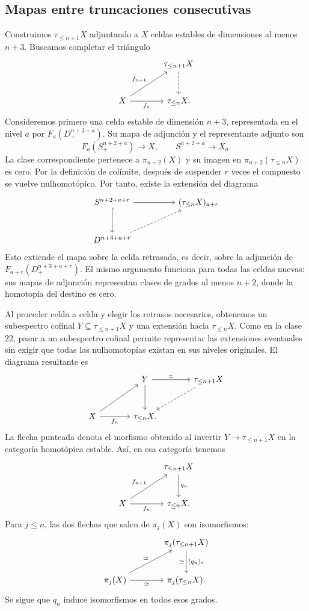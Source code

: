 \subsection{Mapas entre truncaciones consecutivas}
Construimos $\tau_{\leq n+1}X$ adjuntando a $X$ celdas estables de dimensiones al menos $n+3$. Buscamos completar el triángulo
\[
\begin{tikzcd}[column sep=large,row sep=large]
&\tau_{\leq n+1}X\arrow[d,dashed]\\
X\arrow[ur,"f_{n+1}"]\arrow[r,"f_n"']&\tau_{\leq n}X.
\end{tikzcd}
\]
Consideremos primero una celda estable de dimensión $n+3$, representada en el nivel $a$ por $F_a(D^{n+3+a}_+)$. Su mapa de adjunción y el representante adjunto son
\[
F_a(S^{n+2+a}_+)\longrightarrow X,
\qquad
S^{n+2+a}\longrightarrow X_a.
\]
La clase correspondiente pertenece a $\pi_{n+2}(X)$ y su imagen en $\pi_{n+2}(\tau_{\leq n}X)$ es cero. Por la definición de colímite, después de suspender $r$ veces el compuesto se vuelve nulhomotópico. Por tanto, existe la extensión del diagrama
\[
\begin{tikzcd}[column sep=huge,row sep=large]
S^{n+2+a+r}\arrow[r]\arrow[d,hook]& (\tau_{\leq n}X)_{a+r}\\
D^{n+3+a+r}\arrow[ur,dashed]&
\end{tikzcd}
\]
Esto extiende el mapa sobre la celda retrasada, es decir, sobre la adjunción de $F_{a+r}(D^{n+3+a+r}_+)$. El mismo argumento funciona para todas las celdas nuevas: sus mapas de adjunción representan clases de grados al menos $n+2$, donde la homotopía del destino es cero.

Al proceder celda a celda y elegir los retrasos necesarios, obtenemos un subespectro cofinal $Y\subseteq\tau_{\leq n+1}X$ y una extensión hacia $\tau_{\leq n}X$. Como en la clase 22, pasar a un subespectro cofinal permite representar las extensiones eventuales sin exigir que todas las nulhomotopías existan en sus niveles originales. El diagrama resultante es
\[
\begin{tikzcd}[column sep=large,row sep=large]
&Y\arrow[r,"\simeq"]\arrow[d]&\tau_{\leq n+1}X\arrow[dl,dashed]\\
X\arrow[ur]\arrow[r,"f_n"']&\tau_{\leq n}X.&
\end{tikzcd}
\]
La flecha punteada denota el morfismo obtenido al invertir $Y\to\tau_{\leq n+1}X$ en la categoría homotópica estable. Así, en esa categoría tenemos
\[
\begin{tikzcd}[column sep=large,row sep=large]
&\tau_{\leq n+1}X\arrow[d,"q_n"]\\
X\arrow[ur,"f_{n+1}"]\arrow[r,"f_n"']&\tau_{\leq n}X.
\end{tikzcd}
\]
Para $j\leq n$, las dos flechas que salen de $\pi_j(X)$ son isomorfismos:
\[
\begin{tikzcd}[column sep=large,row sep=large]
&\pi_j(\tau_{\leq n+1}X)\arrow[d,"(q_n)_*","\simeq"']\\
\pi_j(X)\arrow[ur,"\simeq"]\arrow[r,"\simeq"']&\pi_j(\tau_{\leq n}X).
\end{tikzcd}
\]
Se sigue que $q_n$ induce isomorfismos en todos esos grados.

